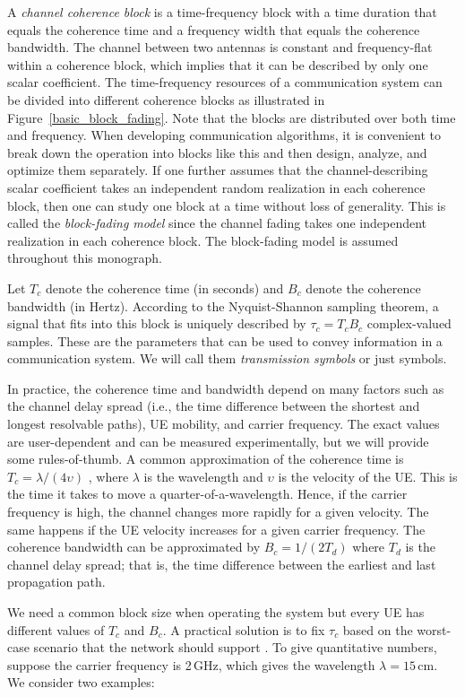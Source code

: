 A \emph{channel coherence block} is a time-frequency block with a time duration that equals the coherence time and a frequency width that equals the coherence bandwidth. The channel between two antennas is constant and frequency-flat within a coherence block, which implies that it can be described by only one scalar coefficient. The time-frequency resources of a communication system can be divided into different coherence blocks as illustrated in Figure~\ref{basic_block_fading}. Note that the blocks are distributed over both time and frequency. When developing communication algorithms, it is convenient to break down the operation into blocks like this and then design, analyze, and optimize them separately. If one further assumes that the channel-describing scalar coefficient takes an independent random realization in each coherence block, then one can study one block at a time without loss of generality. This is called the \emph{block-fading model} since the channel fading takes one independent realization in each coherence block. The block-fading model is assumed throughout this monograph.

Let $T_c$ denote the coherence time (in seconds) and $B_c$ denote the coherence bandwidth (in Hertz). According to the Nyquist-Shannon sampling theorem, a signal that fits into this block is uniquely described by
$\tau_c = T_cB_c$ complex-valued samples. These are the parameters that can be used to convey information in a communication system. We will call them \emph{transmission symbols} or just symbols.

In practice, the coherence time and bandwidth depend on many factors such as the channel delay spread (i.e., the time difference between the shortest and longest resolvable paths), UE mobility, and carrier frequency. The exact values are user-dependent and can be measured experimentally, but we will provide some rules-of-thumb.
A common approximation of the coherence time is $T_c = \lambda/(4 \upsilon)$ \cite[Sec.~2.3]{Tse2005a}, where $\lambda$ is the wavelength and $\upsilon$ is the velocity of the UE. This is the time it takes to move a quarter-of-a-wavelength. Hence, if the carrier frequency is high, the channel changes more rapidly for a given velocity. The same happens if the UE velocity increases for a given carrier frequency. The coherence bandwidth can be approximated by $B_c=1/(2 T_d)$ where $T_d$ is the channel delay spread; that is, the time difference between the earliest and last propagation path.

We need a common block size when operating the system but every UE has different values of $T_c$ and $B_c$. A practical solution is to fix $\tau_c$ based on the worst-case scenario that the network should support \cite[Sec.~2.1]{massivemimobook}. To give quantitative numbers, suppose the carrier frequency is 2\,GHz, which gives the wavelength $\lambda = 15$\,cm. We consider two examples:

